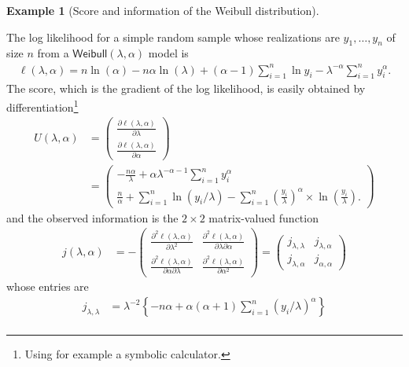 \documentclass[
  11pt,
  letterpaper,
]{scrbook}
\theoremstyle{plain}
\theoremstyle{plain}
\theoremstyle{definition}
\newtheorem{example}{Example}[chapter]
\theoremstyle{definition}
\theoremstyle{remark}
\begin{document}
\begin{example}[Score and information of the Weibull
distribution]\protect\hypertarget{exm-weibull-info}{}\label{exm-weibull-info}

The log likelihood for a simple random sample whose realizations are
\(y_1, \ldots, y_n\) of size \(n\) from a
\(\mathsf{Weibull}(\lambda, \alpha)\) model is \begin{align*}
\ell(\lambda, \alpha) = n \ln(\alpha) - n\alpha\ln(\lambda) + (\alpha-1) \sum_{i=1}^n \ln y_i  - \lambda^{-\alpha}\sum_{i=1}^n y_i^\alpha.
\end{align*} The score, which is the gradient of the log likelihood, is
easily obtained by differentiation\footnote{Using for example a symbolic
  calculator.} \begin{align*}
U(\lambda, \alpha) &= \begin{pmatrix}\frac{\partial \ell(\lambda, \alpha)}{\partial \lambda} \\
\frac{\partial \ell(\lambda, \alpha)}{\partial \alpha} \end{pmatrix} \\&= 
\begin{pmatrix}
 -\frac{n\alpha}{\lambda} +\alpha\lambda^{-\alpha-1}\sum_{i=1}^n y_i^\alpha
 \\
 \frac{n}{\alpha} + \sum_{i=1}^n \ln (y_i/\lambda)  - \sum_{i=1}^n \left(\frac{y_i}{\lambda}\right)^{\alpha} \times\ln\left(\frac{y_i}{\lambda}\right).
 \end{pmatrix}
\end{align*} and the observed information is the \(2 \times 2\)
matrix-valued function \begin{align*}
j(\lambda, \alpha) &= - \begin{pmatrix}
\frac{\partial^2 \ell(\lambda, \alpha)}{\partial \lambda^2} &  \frac{\partial^2 \ell(\lambda, \alpha)}{\partial \lambda \partial \alpha} \\ \frac{\partial^2 \ell(\lambda, \alpha)}{\partial \alpha \partial \lambda} & \frac{\partial^2 \ell(\lambda, \alpha)}{\partial \alpha^2}
\end{pmatrix}  = \begin{pmatrix} j_{\lambda, \lambda} & j_{\lambda, \alpha} \\ j_{\lambda, \alpha} & j_{\alpha, \alpha} \end{pmatrix}
\end{align*} whose entries are \begin{align*}
j_{\lambda, \lambda} &= \lambda^{-2}\left\{-n\alpha + \alpha(\alpha+1)\sum_{i=1}^n (y_i/\lambda)^\alpha\right\} \\

\end{align*}
\end{example}
\end{document}
